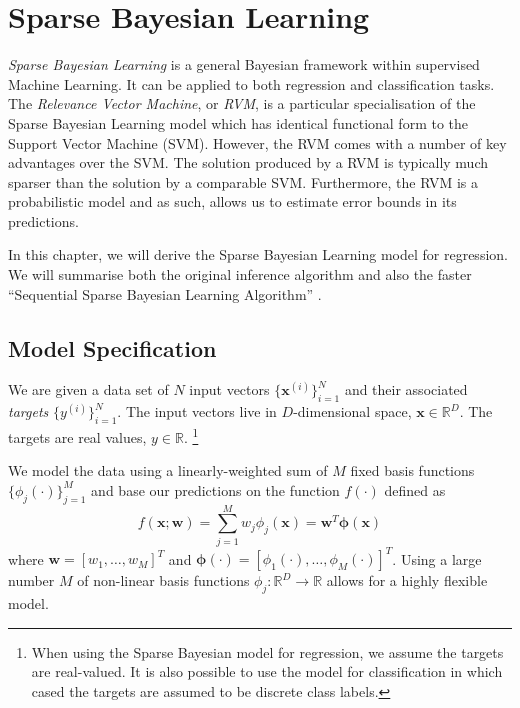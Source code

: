 
\chapter{Sparse Bayesian Learning}
\emph{Sparse Bayesian Learning} \cite{tipping2001} is a general Bayesian framework within supervised Machine Learning. 
It can be applied to both regression and classification tasks.
The \emph{Relevance Vector Machine}, or \emph{RVM}, is a particular specialisation of the Sparse Bayesian Learning model which has identical functional form to the Support Vector Machine (SVM).
However, the RVM comes with a number of key advantages over the SVM. 
The solution produced by a RVM is typically much sparser than the solution by a comparable SVM.
Furthermore, the RVM is a probabilistic model and as such, allows us to estimate error bounds in its predictions.

In this chapter, we will derive the Sparse Bayesian Learning model for regression.
We will summarise both the original inference algorithm \cite{tipping2001} and also the faster ``Sequential Sparse Bayesian Learning Algorithm'' \cite{tipping2003}.

\section{Model Specification}
We are given a data set of $N$ input vectors $\{\bm x^{(i)}\}^N_{i=1}$ and their associated \emph{targets} $\{y^{(i)}\}_{i=1}^N$.
The input vectors live in $D$-dimensional space, $\bm x \in \mathbb{R}^D$.
The targets are real values, $y \in \mathbb{R}$.
\footnote{When using the Sparse Bayesian model for regression, we assume the targets are real-valued.
  It is also possible to use the model for classification in which cased the targets are assumed to be discrete class labels.
}

We model the data using a linearly-weighted sum of $M$ fixed basis functions $\{\phi_j(\cdot)\}_{j=1}^M$ and base our predictions on the function $f(\cdot)$ defined as
\begin{equation} 
  \label{rvm:function}
  f(\bm x; \bm w) = \sum_{j=1}^M w_j \phi_j(\bm x) = \bm w^T \bm \phi(\bm x)
\end{equation}
where $\bm w = [w_1, \dots, w_M]^T$ and $\bm \phi(\cdot) = [\phi_1(\cdot), \dots, \phi_M(\cdot)]^T$.
Using a large number $M$ of non-linear basis functions $\phi_j : \mathbb{R}^D \to \mathbb{R}$ allows for a highly flexible model. 

